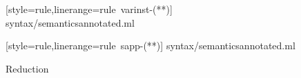 \begin{figure}
  
  [style=rule,linerange=rule\ varinst-(**)]
  {syntax/semanticsannotated.ml}
  \medskip
  
  [style=rule,linerange=rule\ sapp-(**)]
  {syntax/semanticsannotated.ml}
  \caption{Reduction}
\end{figure}


